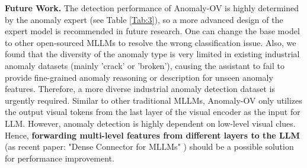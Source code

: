 \noindent
\textbf{Future Work.} The detection performance of Anomaly-OV is highly determined by the anomaly expert (see Table \ref{Tab:3}), so a more advanced design of the expert model is recommended in future research. One can change the base model to other open-sourced MLLMs to resolve the wrong classification issue. Also, we found that the diversity of the anomaly type is very limited in existing industrial anomaly datasets (mainly 'crack' or 'broken'), causing the assistant to fail to provide fine-grained anomaly reasoning or description for unseen anomaly features. Therefore, a more diverse industrial anomaly detection dataset is urgently required. Similar to other traditional MLLMs, Anomaly-OV only utilizes the output visual tokens from the last layer of the visual encoder as the input for LLM. However, anomaly detection is highly dependent on low-level visual clues. Hence, \textbf{forwarding multi-level features from different layers to the LLM} (as recent paper: "Dense Connector for MLLMs" \cite{yao2024denseconnectormllms} ) should be a possible solution for performance improvement.


